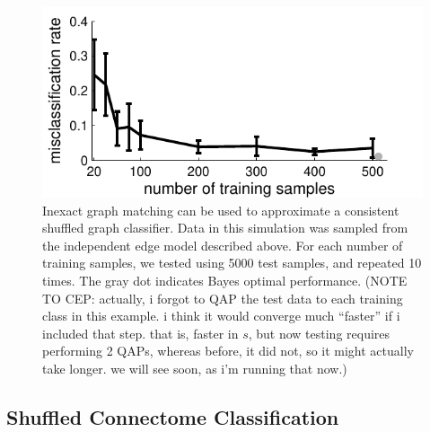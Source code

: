 \documentclass[10pt,journal,cspaper,compsoc]{IEEEtran}
\begin{document}
\begin{figure}[htbp]
	\centering
		\includegraphics[width=1.0\linewidth]{../figs/hetero_easy_n10_MC5000_QAP_vs_n.pdf}
	\caption{Inexact graph matching can be used to approximate a consistent shuffled graph classifier.  Data in this simulation was sampled from the independent edge model described above.  For each number of training samples, we tested using 5000 test samples, and repeated 10 times.  The gray dot indicates Bayes optimal performance. (NOTE TO CEP: actually, i forgot to QAP the test data to each training class in this example.  i think it would converge much ``faster'' if i included that step. that is, faster in $s$, but now testing requires performing 2 QAPs, whereas before, it did not, so it might actually take longer.  we will see soon, as i'm running that now.)}
	\label{fig:1}
\end{figure}






\subsection{Shuffled Connectome Classification} %
\label{sub:connectome_classification}
\end{document}
